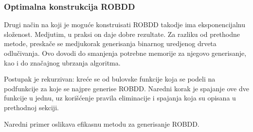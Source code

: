 \subsubsection{Optimalna konstrukcija ROBDD}
\label{subsubsec:optimalROBDDConstruction}

Drugi na\v{c}in na koji je mogu\'c{}e konstruisati ROBDD takodje ima eksponencijalnu slo\v{z}enost. Medjutim, u praksi on daje dobre rezultate. Za razliku od prethodne metode, preska\v{c}e se medjukorak generisanja binarnog uredjenog drveta odlu\v{c}ivanja. Ovo dovodi do smanjenja potrebne memorije za njegovo generisanje, kao i do zna\v{c}ajnog ubrzanja algoritma.

Postupak je rekurzivan: kre\'c{}e se od bulovske funkcije koja se podeli na podfunkcije za koje se najpre generise ROBDD. Naredni korak je spajanje ove dve funkcije u jednu, uz kori\v{s}\'c{}enje pravila eliminacije i spajanja koja su opisana u prethodnoj sekciji.

Naredni primer oslikava efikasnu metodu za generisanje ROBDD.

